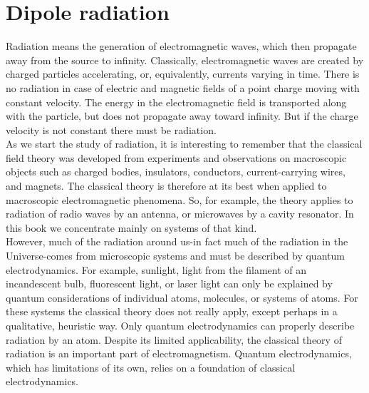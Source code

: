 \chapter{Dipole radiation}
Radiation means the generation of electromagnetic waves, which then propagate away from the source to infinity. Classically, electromagnetic waves are created by charged particles accelerating, or, equivalently, currents varying in time. There is no radiation in case of electric and magnetic fields of a point charge moving with constant velocity. The energy in the electromagnetic field is transported along with the particle, but does not propagate away toward infinity. But if the charge velocity is not constant there must be radiation.\\
As we start the study of radiation, it is interesting to remember that the classical field theory was developed from experiments and observations on macroscopic objects such as charged bodies, insulators, conductors, current-carrying wires, and magnets. The classical theory is therefore at its best when applied to macroscopic electromagnetic phenomena. So, for example, the theory applies to radiation of radio waves by an antenna, or microwaves by a cavity resonator. In this book we concentrate mainly on systems of that kind.\\
 However, much of the radiation around us-in fact much of the radiation in the Universe-comes from microscopic systems and must be described by quantum electrodynamics. For example, sunlight, light from the filament of an incandescent bulb, fluorescent light, or laser light can only be explained by quantum considerations of individual atoms, molecules, or systems of atoms. For these systems the classical theory does not really apply, except perhaps in a qualitative, heuristic way. Only quantum electrodynamics can properly describe radiation by an atom. Despite its limited applicability, the classical theory of radiation is an important part of electromagnetism. Quantum electrodynamics, which has limitations of its own, relies on a foundation of classical electrodynamics.\\
 \newpage
